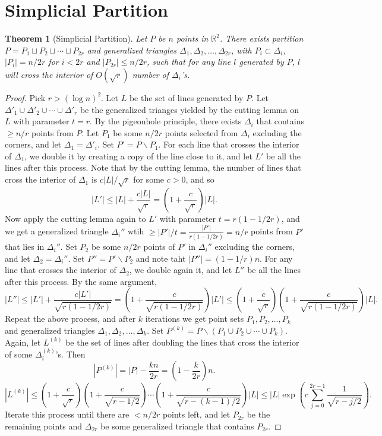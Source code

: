 \documentclass[12pt,reqno]{amsart}
\newtheorem{theorem}{Theorem}[section]
\theoremstyle{definition}
\theoremstyle{remark}
\renewcommand{\leq}{\leqslant}
\renewcommand{\geq}{\geqslant}
\def\R{\mathbb{R}}
\numberwithin{equation}{section}
\begin{document}
\newpage

\section{Simplicial Partition}

\begin{theorem}[Simplicial Partition]
	Let $P$ be $n$ points in $\R^2$. There exists partition $P = P_1 \sqcup P_2 \sqcup \cdots \sqcup P_{2r}$ and generalized triangles $\Delta_1, \Delta_2, \ldots, \Delta_{2r}$, with $P_i \subset \Delta_i$, $|P_i| = n/2r$ for $i < 2r$ and $|P_{2r}| \leq n/2r$, such that for any line $l$ generated by $P$, $l$ will cross the interior of $O(\sqrt{r})$ number of $\Delta_i$'s.
\end{theorem}

\begin{proof}
	Pick $r > (\log n)^2$. Let $L$ be the set of lines generated by $P$. Let $\Delta'_1 \cup \Delta'_2 \cup \cdots \cup \Delta'_r$ be the generalized trianges yielded by the cutting lemma on $L$ with parameter $t = r$. By the pigeonhole principle, there exists $\Delta_i$ that contains $\geq n/r$ points from $P$. Let $P_1$ be some $n/2r$ points selected from $\Delta_i$ excluding the corners, and let $\Delta_1 = \Delta'_i$. Set $P' = P \backslash P_1$. For each line that crosses the interior of $\Delta_1$, we double it by creating a copy of the line close to it, and let $L'$ be all the lines after this process. Note that by the cutting lemma, the number of lines that cross the interior of $\Delta_1$ is $c|L|/\sqrt{r}$ for some $c > 0$, and so
	\[
		|L'| \leq |L| + \frac{c|L|}{\sqrt{r}} = \left(1 + \frac{c}{\sqrt{r}}\right)|L|.
	\]
	Now apply the cutting lemma again to $L'$ with parameter $t = r(1 - 1/2r)$, and we get a generalized triangle $\Delta_i''$ wtih $\geq |P'|/t = \frac{|P'|}{r(1 - 1/2r)} = n/r$ points from $P'$ that lies in $\Delta_i''$. Set $P_2$ be some $n/2r$ points of $P'$ in $\Delta_i''$ excluding the corners, and let $\Delta_2 = \Delta_i''$. Set $P'' = P' \backslash P_2$ and note taht $|P''| = (1 - 1/r)n$. For any line that crosses the interior of $\Delta_2$, we double again it, and let $L''$ be all the lines after this process. By the same argument, 
	\[
		|L''| \leq |L'| + \frac{c|L'|}{\sqrt{r(1 - 1/2r)}} = \left(1 + \frac{c}{\sqrt{r(1 - 1/2r)}}\right)|L'| \leq \left(1 + \frac{c}{\sqrt{r}}\right)\left(1 + \frac{c}{\sqrt{r(1 - 1/2r)}}\right)|L|.
	\]
	Repeat the above process, and after $k$ iterations we get point sets $P_1, P_2, \ldots, P_k$ and generalized triangles $\Delta_1, \Delta_2, \ldots, \Delta_k$. Set $P^{(k)} = P\backslash(P_1 \cup P_2 \cup \cdots \cup P_k)$. Again, let $L^{(k)}$ be the set of lines after doubling the lines that cross the interior of some $\Delta^{(k)}_i$'s. Then
	\[
		|P^{(k)}| = |P| - \frac{kn}{2r} = \left(1 - \frac{k}{2r}\right)n.
	\]
	\[
		|L^{(k)}| \leq \left(1 + \frac{c}{\sqrt{r}}\right)\left(1 + \frac{c}{\sqrt{r - 1/2}}\right) \cdots \left(1 + \frac{c}{\sqrt{r - (k - 1)/2}}\right)|L| \leq |L|\exp\left(c\sum_{j = 0}^{2r - 1} \frac{1}{\sqrt{r - j/2}}\right).
	\]
	Iterate this process until there are $< n/2r$ points left, and let $P_{2r}$ be the remaining points and $\Delta_{2r}$ be some generalized triangle that contains $P_{2r}$.


\end{proof}
\end{document}
